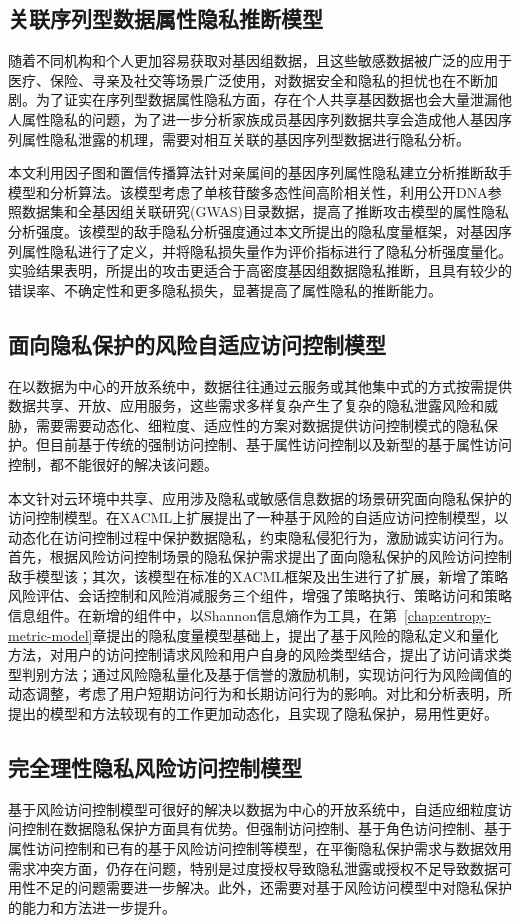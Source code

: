 \subsection{关联序列型数据属性隐私推断模型}

随着不同机构和个人更加容易获取对基因组数据，且这些敏感数据被广泛的应用于医疗、保险、寻亲及社交等场景广泛使用，对数据安全和隐私的担忧也在不断加剧。为了证实在序列型数据属性隐私方面，存在个人共享基因数据也会大量泄漏他人属性隐私的问题，为了进一步分析家族成员基因序列数据共享会造成他人基因序列属性隐私泄露的机理，需要对相互关联的基因序列型数据进行隐私分析。

本文利用因子图和置信传播算法针对亲属间的基因序列属性隐私建立分析推断敌手模型和分析算法。该模型考虑了单核苷酸多态性间高阶相关性，利用公开DNA参照数据集和全基因组关联研究(GWAS)目录数据，提高了推断攻击模型的属性隐私分析强度。该模型的敌手隐私分析强度通过本文所提出的隐私度量框架，对基因序列属性隐私进行了定义，并将隐私损失量作为评价指标进行了隐私分析强度量化。实验结果表明，所提出的攻击更适合于高密度基因组数据隐私推断，且具有较少的错误率、不确定性和更多隐私损失，显著提高了属性隐私的推断能力。

\subsection{面向隐私保护的风险自适应访问控制模型}
在以数据为中心的开放系统中，数据往往通过云服务或其他集中式的方式按需提供数据共享、开放、应用服务，这些需求多样复杂产生了复杂的隐私泄露风险和威胁，需要需要动态化、细粒度、适应性的方案对数据提供访问控制模式的隐私保护。但目前基于传统的强制访问控制、基于属性访问控制以及新型的基于属性访问控制，都不能很好的解决该问题。

本文针对云环境中共享、应用涉及隐私或敏感信息数据的场景研究面向隐私保护的访问控制模型。在XACML上扩展提出了一种基于风险的自适应访问控制模型，以动态化在访问控制过程中保护数据隐私，约束隐私侵犯行为，激励诚实访问行为。首先，根据风险访问控制场景的隐私保护需求提出了面向隐私保护的风险访问控制敌手模型该；其次，该模型在标准的XACML框架及出生进行了扩展，新增了策略风险评估、会话控制和风险消减服务三个组件，增强了策略执行、策略访问和策略信息组件。在新增的组件中，以Shannon信息熵作为工具，在第~\ref{chap:entropy-metric-model}章提出的隐私度量模型基础上，提出了基于风险的隐私定义和量化方法，对用户的访问控制请求风险和用户自身的风险类型结合，提出了访问请求类型判别方法；通过风险隐私量化及基于信誉的激励机制，实现访问行为风险阈值的动态调整，考虑了用户短期访问行为和长期访问行为的影响。对比和分析表明，所提出的模型和方法较现有的工作更加动态化，且实现了隐私保护，易用性更好。
\subsection{完全理性隐私风险访问控制模型}
基于风险访问控制模型可很好的解决以数据为中心的开放系统中，自适应细粒度访问控制在数据隐私保护方面具有优势。但强制访问控制、基于角色访问控制、基于属性访问控制和已有的基于风险访问控制等模型，在平衡隐私保护需求与数据效用需求冲突方面，仍存在问题，特别是过度授权导致隐私泄露或授权不足导致数据可用性不足的问题需要进一步解决。此外，还需要对基于风险访问模型中对隐私保护的能力和方法进一步提升。

